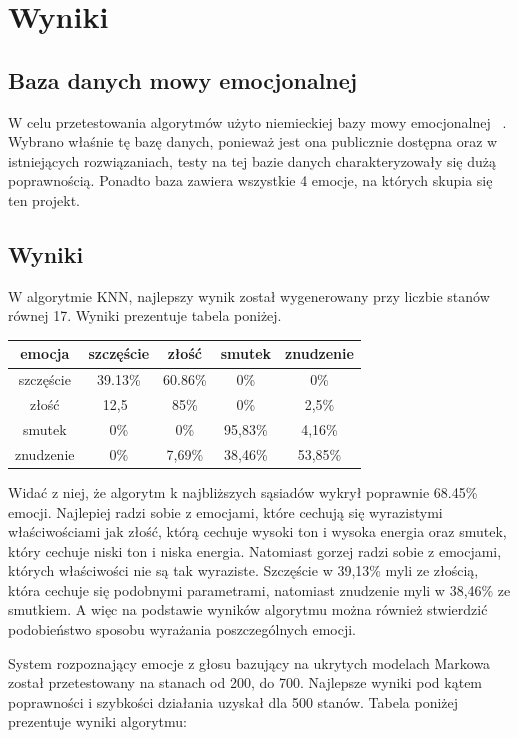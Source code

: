 \documentclass[declaration,shortabstract]{iithesis}
\begin{document}
\chapter{Wyniki}
\section{Baza danych mowy emocjonalnej}
W celu przetestowania algorytmów użyto niemieckiej bazy mowy emocjonalnej ~\cite{BDemo}. Wybrano właśnie tę bazę danych, ponieważ jest ona publicznie dostępna oraz w istniejących rozwiązaniach, testy na tej bazie danych charakteryzowały się dużą poprawnością. Ponadto baza zawiera wszystkie 4 emocje, na których skupia się ten projekt.

\section{Wyniki}
W algorytmie KNN, najlepszy wynik został wygenerowany przy liczbie stanów równej 17. Wyniki prezentuje tabela poniżej.

\begin{center}
  \begin{tabular}{| c | c | c | c | c |}
    \hline
    emocja & szczęście & złość & smutek & znudzenie \\ \hline
    szczęście & 39.13\% & 60.86\% & 0\% & 0\% \\ \hline
	złość & 12,5\ & 85\% & 0\% & 2,5\% \\ \hline
	smutek & 0\% & 0\% & 95,83\% & 4,16\% \\ \hline
	znudzenie & 0\% & 7,69\% & 38,46\% & 53,85\% \\
    \hline
  \end{tabular}
\end{center}

Widać z niej, że algorytm k najbliższych sąsiadów wykrył poprawnie 68.45\% emocji. Najlepiej radzi sobie z emocjami, które cechują się wyrazistymi właściwościami jak złość, którą cechuje wysoki ton i wysoka energia oraz smutek, który cechuje niski ton i niska energia. Natomiast gorzej radzi sobie z emocjami, których właściwości nie są tak wyraziste. Szczęście w 39,13\% myli ze złością, która cechuje się podobnymi parametrami, natomiast znudzenie myli w 38,46\% ze smutkiem. A więc na podstawie wyników algorytmu można również stwierdzić podobieństwo sposobu wyrażania poszczególnych emocji.

System rozpoznający emocje z głosu bazujący na ukrytych modelach Markowa został przetestowany na stanach od 200, do 700. Najlepsze wyniki pod kątem poprawności i szybkości działania uzyskał dla 500 stanów. Tabela poniżej prezentuje wyniki algorytmu: 
\end{document}
